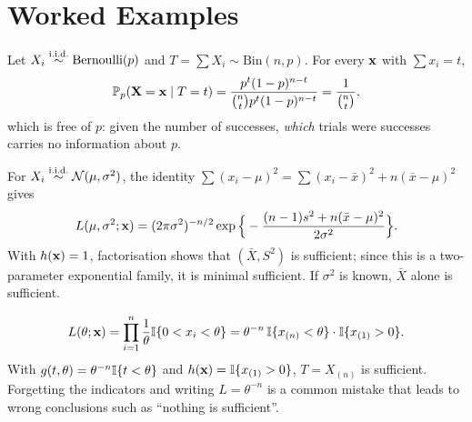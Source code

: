 \documentclass[main.tex]{subfiles}
\begin{document}
\section{Worked Examples}

\begin{example}\label{ex:bernoulli-yeterli}
Let $X_i\overset{\text{i.i.d.}}{\sim}\text{Bernoulli}(p)$ and $T=\sum X_i\sim\text{Bin}(n,p)$. For every $\mathbf{x}$ with $\sum x_i=t$,
\[
\mathbb{P}_p(\mathbf{X}=\mathbf{x}\mid T=t)=\frac{p^t(1-p)^{n-t}}{\binom nt p^t(1-p)^{n-t}}=\frac{1}{\binom nt},
\]
which is free of $p$: given the number of successes, \emph{which} trials were successes carries no information about $p$.
\end{example}

\begin{example}
For $X_i\overset{\text{i.i.d.}}{\sim}\mathcal{N}(\mu,\sigma^2)$, the identity $\sum(x_i-\mu)^2=\sum(x_i-\bar x)^2+n(\bar x-\mu)^2$ gives
\[
L(\mu,\sigma^2;\mathbf{x})=(2\pi\sigma^2)^{-n/2}\exp\Big\{-\frac{(n-1)s^2+n(\bar x-\mu)^2}{2\sigma^2}\Big\}.
\]
With $h(\mathbf{x})=1$, factorisation shows that $(\bar X,S^2)$ is sufficient; since this is a two-parameter exponential family, it is minimal sufficient. If $\sigma^2$ is known, $\bar X$ alone is sufficient.
\end{example}

\begin{example}\label{ex:uniform-yeterli}
\[
L(\theta;\mathbf{x})=\prod_{i=1}^n\frac1\theta\mathbb{I}\{0<x_i<\theta\}=\theta^{-n}\,\mathbb{I}\{x_{(n)}<\theta\}\cdot\mathbb{I}\{x_{(1)}>0\}.
\]
With $g(t,\theta)=\theta^{-n}\mathbb{I}\{t<\theta\}$ and $h(\mathbf{x})=\mathbb{I}\{x_{(1)}>0\}$, $T=X_{(n)}$ is sufficient. Forgetting the indicators and writing $L=\theta^{-n}$ is a common mistake that leads to wrong conclusions such as ``nothing is sufficient''.
\end{example}
\end{document}
